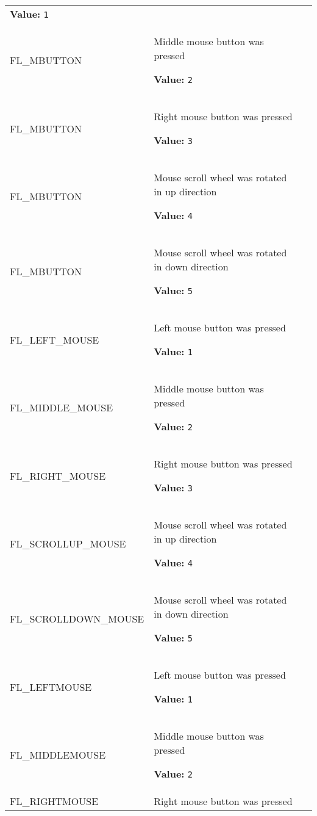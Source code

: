 \begin{longtable}{|p{\varnamewidth}|p{\vardescrwidth}|l}
\textbf{Value:} 
{\tt 1}&\\
\cline{1-2}
\raggedright F\-L\-\_\-M\-B\-U\-T\-T\-O\-N\-2\- & \raggedright Middle mouse button was pressed

\textbf{Value:} 
{\tt 2}&\\
\cline{1-2}
\raggedright F\-L\-\_\-M\-B\-U\-T\-T\-O\-N\-3\- & \raggedright Right mouse button was pressed

\textbf{Value:} 
{\tt 3}&\\
\cline{1-2}
\raggedright F\-L\-\_\-M\-B\-U\-T\-T\-O\-N\-4\- & \raggedright Mouse scroll wheel was rotated in up direction

\textbf{Value:} 
{\tt 4}&\\
\cline{1-2}
\raggedright F\-L\-\_\-M\-B\-U\-T\-T\-O\-N\-5\- & \raggedright Mouse scroll wheel was rotated in down direction

\textbf{Value:} 
{\tt 5}&\\
\cline{1-2}
\raggedright F\-L\-\_\-L\-E\-F\-T\-\_\-M\-O\-U\-S\-E\- & \raggedright Left mouse button was pressed

\textbf{Value:} 
{\tt 1}&\\
\cline{1-2}
\raggedright F\-L\-\_\-M\-I\-D\-D\-L\-E\-\_\-M\-O\-U\-S\-E\- & \raggedright Middle mouse button was pressed

\textbf{Value:} 
{\tt 2}&\\
\cline{1-2}
\raggedright F\-L\-\_\-R\-I\-G\-H\-T\-\_\-M\-O\-U\-S\-E\- & \raggedright Right mouse button was pressed

\textbf{Value:} 
{\tt 3}&\\
\cline{1-2}
\raggedright F\-L\-\_\-S\-C\-R\-O\-L\-L\-U\-P\-\_\-M\-O\-U\-S\-E\- & \raggedright Mouse scroll wheel was rotated in up direction

\textbf{Value:} 
{\tt 4}&\\
\cline{1-2}
\raggedright F\-L\-\_\-S\-C\-R\-O\-L\-L\-D\-O\-W\-N\-\_\-M\-O\-U\-S\-E\- & \raggedright Mouse scroll wheel was rotated in down direction

\textbf{Value:} 
{\tt 5}&\\
\cline{1-2}
\raggedright F\-L\-\_\-L\-E\-F\-T\-M\-O\-U\-S\-E\- & \raggedright Left mouse button was pressed

\textbf{Value:} 
{\tt 1}&\\
\cline{1-2}
\raggedright F\-L\-\_\-M\-I\-D\-D\-L\-E\-M\-O\-U\-S\-E\- & \raggedright Middle mouse button was pressed

\textbf{Value:} 
{\tt 2}&\\
\cline{1-2}
\raggedright F\-L\-\_\-R\-I\-G\-H\-T\-M\-O\-U\-S\-E\- & \raggedright Right mouse button was pressed


\end{longtable}
